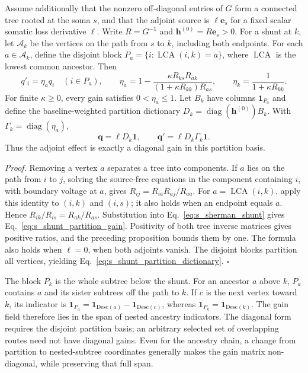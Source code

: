 \begin{corollary}
\label{cor:shunt_ancestry_gain}
Assume additionally that the nonzero off-diagonal entries of $G$ form a
connected tree rooted at the soma $s$, and that the adjoint source is
$\ell\bm e_s$ for a fixed scalar somatic loss derivative $\ell$. Write
$R=G^{-1}$ and $\bm h^{(0)}=R\bm e_s>0$. For a shunt at $k$, let
$\mathcal A_k$ be the vertices on the path from $s$ to $k$, including both
endpoints. For each $a\in\mathcal A_k$, define the disjoint block
$P_a=\{i:\operatorname{LCA}(i,k)=a\}$, where $\operatorname{LCA}$ is the
lowest common ancestor. Then
\begin{equation}
q'_i=\eta_a q_i\quad(i\in P_a),\qquad
\eta_a=1-\frac{\kappa R_{ks}R_{ak}}
{(1+\kappa R_{kk})R_{as}},\qquad
\eta_k=\frac{1}{1+\kappa R_{kk}}.
\label{eq:s_shunt_partition_gain}
\end{equation}
For finite $\kappa\geq0$, every gain satisfies $0<\eta_a\leq1$.
Let $B_k$ have columns $\bm 1_{P_a}$ and define the baseline-weighted
partition dictionary $D_k=\operatorname{diag}(\bm h^{(0)})B_k$. With
$\Gamma_k=\operatorname{diag}(\eta_a)$,
\begin{equation}
\bm q=\ell D_k\bm 1,\qquad
\bm q'=\ell D_k\Gamma_k\bm 1.
\label{eq:s_shunt_partition_dictionary}
\end{equation}
Thus the adjoint effect is exactly a diagonal gain in this partition basis.
\end{corollary}

\noindent\emph{Proof.}
Removing a vertex $a$ separates a tree into components. If $a$ lies on the
path from $i$ to $j$, solving the source-free equations in the component
containing $i$, with boundary voltage at $a$, gives
$R_{ij}=R_{ia}R_{aj}/R_{aa}$. For
$a=\operatorname{LCA}(i,k)$, apply this identity to $(i,k)$ and $(i,s)$;
it also holds when an endpoint equals $a$. Hence
$R_{ik}/R_{is}=R_{ak}/R_{as}$. Substitution into
Eq.~\ref{eq:s_sherman_shunt} gives Eq.~\ref{eq:s_shunt_partition_gain}.
Positivity of both tree inverse matrices gives positive ratios, and the
preceding proposition bounds them by one. The formula also holds when
$\ell=0$, when both adjoints vanish. The disjoint blocks partition all
vertices, yielding Eq.~\ref{eq:s_shunt_partition_dictionary}.
\hfill$\square$

The block $P_k$ is the whole subtree below the shunt. For an ancestor $a$
above $k$, $P_a$ contains $a$ and its sister subtrees off the path to $k$.
If $c$ is the next vertex toward $k$, its indicator is
$\bm 1_{P_a}=\bm 1_{\mathrm{Desc}(a)}-\bm 1_{\mathrm{Desc}(c)}$,
whereas $\bm 1_{P_k}=\bm 1_{\mathrm{Desc}(k)}$. The gain field therefore
lies in the span of nested ancestry indicators. The diagonal form requires
the disjoint partition basis; an arbitrary selected set of overlapping
routes need not have diagonal gains. Even for the ancestry chain, a change
from partition to nested-subtree coordinates generally makes the gain
matrix non-diagonal, while preserving that full span.

